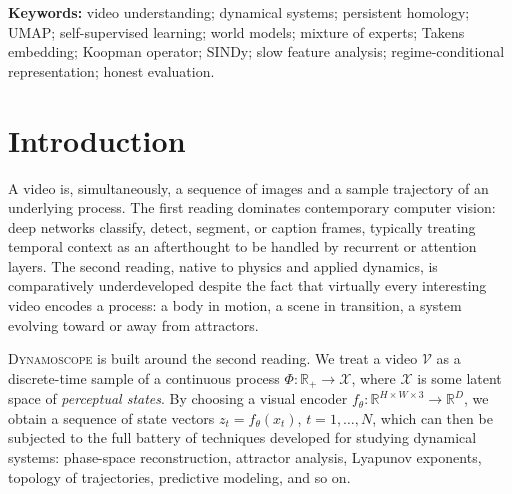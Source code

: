 \documentclass[11pt,a4paper]{article}
\begin{document}
\begin{abstract}
\textbf{We are explicit about what these results do not show.}
The architectural comparisons are dominated by 1-step latent-space MSE,
i.e.\ the model's own training objective; the one rollout experiment
we do run (Sec.~\ref{sec:rwm-rollout}) falsifies the implied stability
of that local advantage.
No downstream task (planning, control, anomaly detection) is tested.
Data is procedurally generated, not real action video. Regime labels
are required for training. The architecture is small (134K
parameters) and only three seeds are reported on the largest
benchmark. The architectural contribution should be read as a
structured mixture-of-experts with regime-conditional losses,
empirically analyzed on synthetic systems---not as a new world-model
paradigm. We release all code, datasets, experiment scripts, and JSON
result files at the accompanying repository.
\end{abstract}

\textbf{Keywords:} video understanding; dynamical systems; persistent
homology; UMAP; self-supervised learning; world models; mixture of
experts; Takens embedding; Koopman operator; SINDy; slow feature
analysis; regime-conditional representation; honest evaluation.

\section{Introduction}

A video is, simultaneously, a sequence of images and a sample
trajectory of an underlying process. The first reading dominates
contemporary computer vision: deep networks classify, detect, segment,
or caption frames, typically treating temporal context as an
afterthought to be handled by recurrent or attention layers. The
second reading, native to physics and applied dynamics, is comparatively
underdeveloped despite the fact that virtually every interesting video
encodes a process: a body in motion, a scene in transition, a system
evolving toward or away from attractors.

\textsc{Dynamoscope} is built around the second reading. We treat a
video $\mathcal{V}$ as a discrete-time sample of a continuous
process $\Phi: \mathbb{R}_+ \to \mathcal{X}$, where $\mathcal{X}$
is some latent space of \emph{perceptual states}. By choosing a
visual encoder $f_\theta: \mathbb{R}^{H\times W\times 3} \to
\mathbb{R}^D$, we obtain a sequence of state vectors
$z_t = f_\theta(x_t)$, $t=1,\dots,N$, which can then be subjected to
the full battery of techniques developed for studying dynamical
systems: phase-space reconstruction, attractor analysis,
Lyapunov exponents, topology of trajectories, predictive modeling,
and so on.
\end{document}
